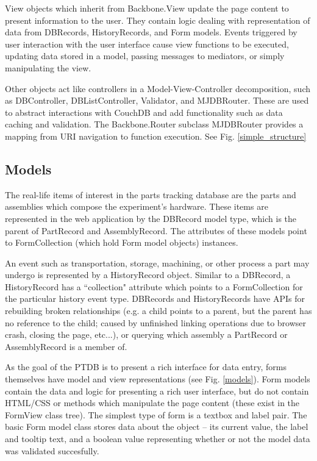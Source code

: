 \documentclass[journal]{IEEEtran}
\begin{document}
View objects which inherit from Backbone.View update the page content to present information to the user. They contain logic dealing with
representation of data from DBRecords, HistoryRecords, and Form models. Events triggered by user interaction with the user interface cause 
view functions to be executed, updating data stored in a model, passing messages to mediators, or simply manipulating the view.

Other objects act like controllers in a Model-View-Controller decomposition, such as DBController, DBListController, Validator,
and MJDBRouter. These are used to abstract interactions with CouchDB and add functionality such as data caching and validation. 
The Backbone.Router subclass MJDBRouter provides a mapping from URI navigation to function execution. See Fig. \ref{simple_structure}


\subsection{Models}
The real-life items of interest in the parts tracking database are the parts and assemblies which compose
the experiment's hardware. These items are represented in the web application by the DBRecord model type, which is
the parent of PartRecord and AssemblyRecord. The attributes of these models point to FormCollection (which hold
Form model objects) instances.

An event such as transportation, storage, machining, or other process a part may undergo is represented by a 
HistoryRecord object. Similar to a DBRecord, a HistoryRecord has a ``collection" attribute which points to a
FormCollection for the particular history event type. DBRecords and HistoryRecords have APIs for rebuilding
broken relationships (e.g. a child points to a parent, but the parent has no reference to the child; caused by 
unfinished linking operations due to browser crash, closing the page, etc...), or querying
which assembly a PartRecord or AssemblyRecord is a member of.

As the goal of the PTDB is to present a rich interface for data entry, forms
themselves have model and view representations (see Fig. \ref{models}). 
Form models contain the data and logic for presenting a rich user interface, but do not contain HTML/CSS or
methods which manipulate the page content (these exist in the FormView class tree).
The simplest type of form is a textbox and label pair. The basic Form model class stores data 
about the object -- its current value, the label and tooltip text,
and a boolean value representing whether or not the model data was validated succesfully.
\end{document}
